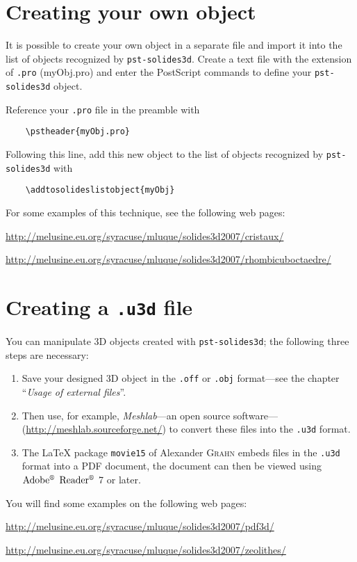 \section{Creating your own object}
It is possible to create your own object in a separate file and
import it into the list of objects recognized by
\texttt{pst-solides3d}. Create a text file with the extension of \texttt{.pro}
(myObj.pro) and enter the PostScript commands to define your
\texttt{pst-solides3d} object.

Reference your \texttt{.pro} file in the preamble with
\begin{verbatim}
    \pstheader{myObj.pro}
\end{verbatim}
Following this line, add this new object to the list of objects recognized by \texttt{pst-solides3d}
with
\begin{verbatim}
    \addtosolideslistobject{myObj}
\end{verbatim}

For some examples of this technique, see the following web pages:

\centerline{\url{http://melusine.eu.org/syracuse/mluque/solides3d2007/cristaux/}}

\centerline{\url{http://melusine.eu.org/syracuse/mluque/solides3d2007/rhombicuboctaedre/}}


\section{Creating a \texttt{.u3d} file}

You can manipulate 3D objects created with \texttt{pst-solides3d};
the following three steps are necessary:
\begin{enumerate}
\item Save your designed 3D object in the \texttt{.off} or
    \texttt{.obj} format---see the chapter ``\textit{Usage of external files}''.

\item Then use, for example, \textit{Meshlab}---an open source software---(\url{http://meshlab.sourceforge.net/}) to convert these files
    into the \texttt{.u3d} format.

\item The {\LaTeX} package \texttt{movie15} of Alexander \textsc{Grahn} embeds
    files in the \texttt{.u3d} format into a PDF document, the document can then be viewed
    using $\text{Adobe}^{\text{\tiny\circledR}}$ $\text{Reader}^{\text{\tiny\circledR}}$ 7 or later.
\end{enumerate}

You will find some examples on the following web pages:

\centerline{\url{http://melusine.eu.org/syracuse/mluque/solides3d2007/pdf3d/}}

\centerline{\url{http://melusine.eu.org/syracuse/mluque/solides3d2007/zeolithes/}}

\endinput
